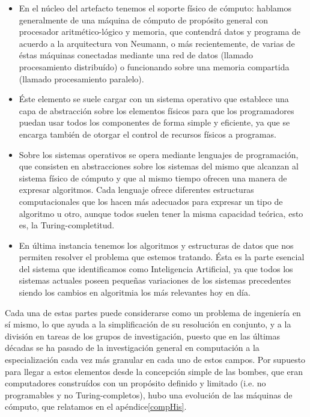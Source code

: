 \documentclass[12pt]{memoir}
\begin{document}
\begin{itemize}
	\item En el núcleo del artefacto tenemos el soporte físico de cómputo: hablamos generalmente de una máquina de cómputo de propósito general con procesador aritmético-lógico y memoria, que contendrá datos y programa de acuerdo a la arquitectura von Neumann, o más recientemente, de varias de éstas máquinas conectadas mediante una red de datos (llamado procesamiento distribuído) o funcionando sobre una memoria compartida (llamado procesamiento paralelo).
	\item Éste elemento se suele cargar con un sistema operativo que establece una capa de abstracción sobre los elementos físicos para que los programadores puedan usar todos los componentes de forma simple y eficiente, ya que se encarga también de otorgar el control de recursos físicos a programas.
	\item Sobre los sistemas operativos se opera mediante lenguajes de programación, que consisten en abstracciones sobre los sistemas del mismo que alcanzan al sistema físico de cómputo y que al mismo tiempo ofrecen una manera de expresar algoritmos. Cada lenguaje ofrece diferentes estructuras computacionales que los hacen más adecuados para expresar un tipo de algoritmo u otro, aunque todos suelen tener la misma capacidad teórica, esto es, la Turing-completitud.
	\item En última instancia tenemos los algoritmos y estructuras de datos que nos permiten resolver el problema que estemos tratando. Ésta es la parte esencial del sistema que identificamos como Inteligencia Artificial, ya que todos los sistemas actuales poseen pequeñas variaciones de los sistemas precedentes siendo los cambios en algoritmia los más relevantes hoy en día.
\end{itemize}

Cada una de estas partes puede considerarse como un problema de ingeniería en sí mismo, lo que ayuda a la simplificación de su resolución en conjunto, y a la división en tareas de los grupos de investigación, puesto que en las últimas décadas se ha pasado de la investigación general en computación a la especialización cada vez más granular en cada uno de estos campos. Por supuesto para llegar a estos elementos desde la concepción simple de las bombes, que eran computadores construídos con un propósito definido y limitado (i.e. no programables y no Turing-completos), hubo una evolución de las máquinas de cómputo, que relatamos en el apéndice\ref{compHis}.
\end{document}
